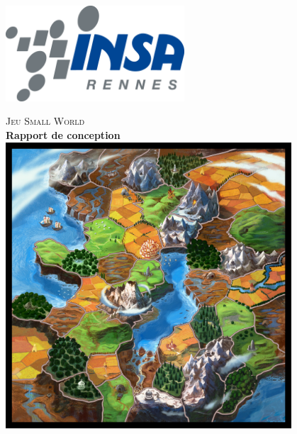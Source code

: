\documentclass[a4paper]{article}%
\begin{document}
\begin{titlepage}
\begin{center}

\begin{flushleft}
\includegraphics[width=0.5\textwidth]{./images/LogotypeINSARennes-web-RVB.png}~\\[1cm]
\end{flushleft}

\textsc{\LARGE Jeu Small World}\\
\huge \bfseries Rapport de conception \\[1cm]

\includegraphics[width=0.8\textwidth]{./images/plateau_smallworld.jpg}~\\[1cm]



\end{center}
\end{titlepage}
\end{document}
